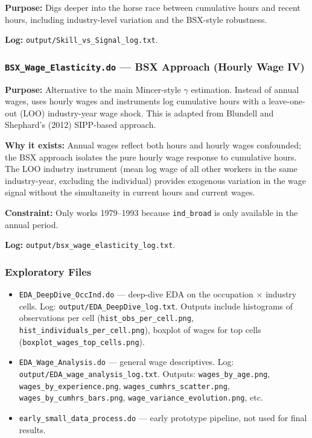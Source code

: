 \documentclass[11pt, letterpaper]{article}
\newcommand{\codebox}[1]{\texttt{\small #1}}
\newcommand{\dofile}[1]{\texttt{#1}}
\newcommand{\logfile}[1]{\texttt{#1}}
\newcommand{\outputfile}[1]{\texttt{#1}}
\begin{document}
\textbf{Purpose:} Digs deeper into the horse race between cumulative hours and recent hours, including industry-level variation and the BSX-style robustness.

\textbf{Log:} \logfile{output/Skill\_vs\_Signal\_log.txt}.

\vspace{6pt}
\subsubsection{\dofile{BSX\_Wage\_Elasticity.do} \textnormal{--- BSX Approach (Hourly Wage IV)}}

\textbf{Purpose:} Alternative to the main Mincer-style $\gamma$ estimation. Instead of annual wages, uses hourly wages and instruments log cumulative hours with a leave-one-out (LOO) industry-year wage shock. This is adapted from Blundell and Shephard's (2012) SIPP-based approach.

\textbf{Why it exists:} Annual wages reflect both hours and hourly wages confounded; the BSX approach isolates the pure hourly wage response to cumulative hours. The LOO industry instrument (mean log wage of all other workers in the same industry-year, excluding the individual) provides exogenous variation in the wage signal without the simultaneity in current hours and current wages.

\textbf{Constraint:} Only works 1979--1993 because \codebox{ind\_broad} is only available in the annual period.

\textbf{Log:} \logfile{output/bsx\_wage\_elasticity\_log.txt}.

\vspace{6pt}
\subsubsection{Exploratory Files}

\begin{itemize}
    \item \dofile{EDA\_DeepDive\_OccInd.do} --- deep-dive EDA on the occupation $\times$ industry cells. Log: \logfile{output/EDA\_DeepDive\_log.txt}. Outputs include histograms of observations per cell (\outputfile{hist\_obs\_per\_cell.png}, \outputfile{hist\_individuals\_per\_cell.png}), boxplot of wages for top cells (\outputfile{boxplot\_wages\_top\_cells.png}).
    \item \dofile{EDA\_Wage\_Analysis.do} --- general wage descriptives. Log: \logfile{output/EDA\_wage\_analysis\_log.txt}. Outputs: \outputfile{wages\_by\_age.png}, \outputfile{wages\_by\_experience.png}, \outputfile{wages\_cumhrs\_scatter.png}, \outputfile{wages\_by\_cumhrs\_bars.png}, \outputfile{wage\_variance\_evolution.png}, etc.
    \item \dofile{early\_small\_data\_process.do} --- early prototype pipeline, not used for final results.
\end{itemize}
\end{document}
